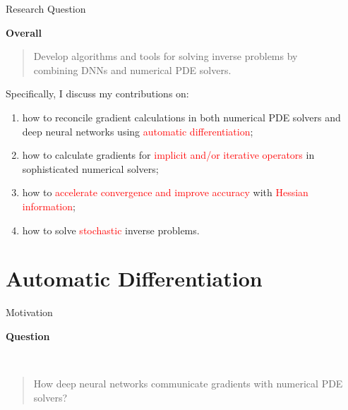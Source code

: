 \documentclass[usenames,dvipsnames]{beamer}
\begin{document}
\begin{frame}{Research Question}
	
	\textbf{Overall}
	
	\vspace{0.2cm}
	
	\begin{quote}
	Develop algorithms and tools for solving inverse problems by \\ combining DNNs and numerical PDE solvers. 
	\end{quote}

	
	
	Specifically, I discuss my contributions on:	
\begin{enumerate}
\item how to reconcile gradient calculations in both numerical PDE solvers and deep neural networks using \textcolor{red}{automatic differentiation};
\item how to calculate gradients for \textcolor{red}{implicit and/or iterative operators} in sophisticated numerical solvers;
\item how to \textcolor{red}{accelerate convergence and improve accuracy} with \textcolor{red}{Hessian information};
\item how to solve \textcolor{red}{stochastic} inverse problems. 
\end{enumerate}
\end{frame}



\section{Automatic Differentiation}

\begin{frame}{Motivation}

\textbf{Question}

\

\begin{quote}
	How deep neural networks communicate gradients with numerical PDE solvers?
\end{quote}

\end{frame}
\end{document}

